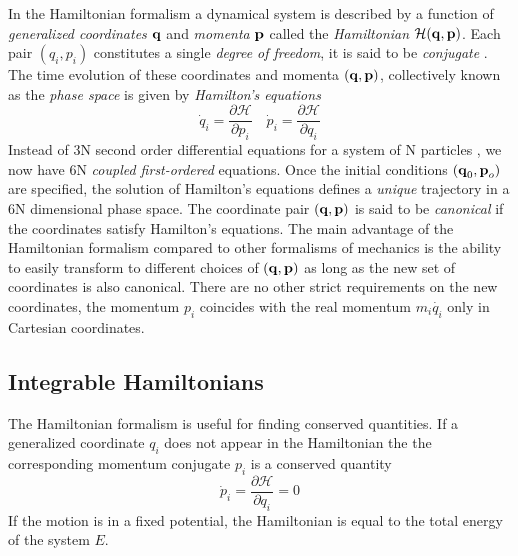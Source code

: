 In the Hamiltonian formalism a dynamical system is described by 
a function of \emph{generalized coordinates} $\boldsymbol{\mathbf{q}}$ and \emph{momenta} 
$\boldsymbol{\mathbf{p}}$ called the \emph{Hamiltonian} $\mathcal{H}(\boldsymbol{\mathbf{q}},
\boldsymbol{\mathbf{p}})$. Each pair $(q_i,p_i)$ constitutes a single 
\emph{degree of freedom}, it is said to be \emph{conjugate} . 
The time evolution of these coordinates and 
momenta
$(\boldsymbol{\mathbf{q}},\boldsymbol{\mathbf{p}})$, collectively known as the \emph{phase space} 
is given by \emph{Hamilton's equations} 
\begin{equation}
    \dot{q}_i= \frac{\partial \mathcal{H}}{\partial p_i}\quad
    \dot{p}_i= \frac{\partial \mathcal{H}}{\partial q_i} 
\end{equation}
Instead of 3N second order differential equations for a system of N particles
, we now have 
6N \emph{coupled first-ordered} equations. Once the initial conditions
$(\boldsymbol{\mathbf{q}}_0,\boldsymbol{\mathbf{p}}_o)$ are specified, the solution of Hamilton's 
equations defines a \emph{unique} trajectory in a 
6N dimensional phase space. The coordinate pair $(\boldsymbol{\mathbf{q}},\boldsymbol{\mathbf{p}})$
is said to be \emph{canonical} if the coordinates satisfy 
Hamilton's equations. The main advantage of the Hamiltonian
formalism compared to other formalisms of mechanics is the ability
to easily transform to different choices of $(\boldsymbol{\mathbf{q}},\boldsymbol{\mathbf{p}})$
as long as the new set of coordinates is also canonical. There are no
other strict requirements on the new coordinates, the momentum 
$p_i$ coincides with the real momentum $m_i \dot{q_i}$ only in
Cartesian coordinates.

\subsection{Integrable Hamiltonians}
The Hamiltonian formalism is useful for finding conserved quantities.
If a generalized coordinate $q_i$ does not appear in the Hamiltonian
the the corresponding momentum conjugate $p_i$ is a conserved quantity
\begin{equation}
    \dot{p}_i= \frac{\partial \mathcal{H}}{\partial q_i} =0
\end{equation}
If the motion is in a fixed potential, the Hamiltonian is equal
to the total energy of the system $E$.


